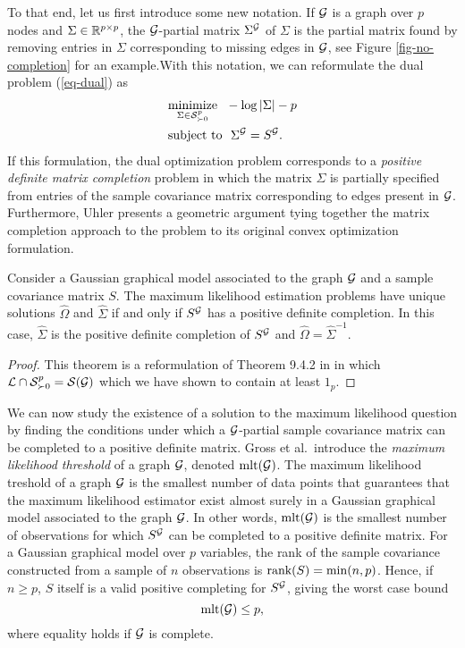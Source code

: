 To that end, let us first introduce some new notation. If ${\mathcal{G}}$ is a graph over $p$ nodes and $\Sigma \in \mathbb{R}^{p\times p}$, the ${\mathcal{G}}$-partial matrix $\Sigma^{\mathcal{G}}$ of $\Sigma$ is the partial matrix found by removing entries in $\Sigma$ corresponding to missing edges in ${\mathcal{G}}$, see Figure \ref{fig-no-completion} for an example.With this notation, we can reformulate the dual problem (\ref{eq-dual}) as
\begin{align} \label{eq-completion}
    \begin{split}    
        &\underset{\Sigma \in \S^p_{\succ 0}}{\t{minimize}}\ \  -\log |\Sigma| - p\\
        &\t{subject to}\ \ \Sigma^\G = S^\G.
    \end{split}
\end{align}
If this formulation, the dual optimization problem corresponds to a \textit{positive definite matrix completion} problem in which the matrix $\Sigma$ is partially specified from entries of the sample covariance matrix corresponding to edges present in ${\mathcal{G}}$. Furthermore, Uhler \cite[Section 9.4]{maathuis2018handbook} presents a geometric argument tying together the matrix completion approach to the problem to its original convex optimization formulation.

\begin{theorem}
    Consider a Gaussian graphical model associated to the graph ${\mathcal{G}}$ and a sample covariance matrix $S$. The maximum likelihood estimation problems have unique solutions $\hat\Omega$ and $\hat\Sigma$ if and only if $S^{\mathcal{G}}$ has a positive definite completion. In this case, $\hat\Sigma$ is the positive definite completion of $S^{\mathcal{G}}$ and $\hat\Omega = \hat\Sigma^{-1}$.
\end{theorem}
\begin{proof}
    This theorem is a reformulation of Theorem 9.4.2 in \cite{maathuis2018handbook} in which ${\mathcal{L}} \cap {\mathcal{S}}^p_{\succ 0} = {\mathcal{S}}({\mathcal{G}})$ which we have shown to contain at least $1_p$.
\end{proof}

We can now study the existence of a solution to the maximum likelihood question by finding the conditions under which a ${\mathcal{G}}$-partial sample covariance matrix can be completed to a positive definite matrix. Gross et al.\,\cite{10.3150/16-BEJ881} introduce the \textit{maximum likelihood threshold} of a graph ${\mathcal{G}}$, denoted ${\textrm{mlt}}({\mathcal{G}})$. The maximum likelihood treshold of a graph ${\mathcal{G}}$ is the smallest number of data points that guarantees that the maximum likelihood estimator exist almost surely in a Gaussian graphical model associated to the graph ${\mathcal{G}}$. In other words, ${\textrm{mlt}}({\mathcal{G}})$ is the smallest number of observations for which $S^{\mathcal{G}}$ can be completed to a positive definite matrix. For a Gaussian graphical model over $p$ variables, the rank of the sample covariance constructed from a sample of $n$ observations is ${\textrm{rank}}(S) = \min(n, p)$. Hence, if $n \geq p$, $S$ itself is a valid positive completing for $S^{\mathcal{G}}$, giving the worst case bound
\begin{equation} \label{eq-pessimistic-mlt}
    {\textrm{mlt}}({\mathcal{G}}) \leq p,
\end{equation}
where equality holds if ${\mathcal{G}}$ is complete.

